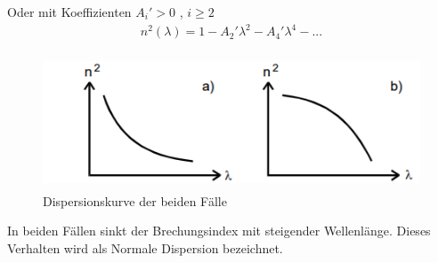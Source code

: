 Oder mit Koeffizienten $A_i' > 0$ , $i \geq 2$
\begin{align}
  {n}^2 (\lambda) = 1 - A_2' \lambda^2 - A_4' \lambda^4 - ...
\end{align}

\begin{figure}[H]
  \centering
  \includegraphics[height=4cm]{dispersion.PNG}
  \caption{Dispersionskurve der beiden Fälle \cite{sample}}
  \label{fig:biegungbild1}
\end{figure}

In beiden Fällen sinkt der Brechungsindex mit steigender Wellenlänge. Dieses Verhalten wird als Normale Dispersion bezeichnet.
